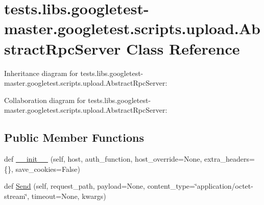 \hypertarget{classtests_1_1libs_1_1googletest-master_1_1googletest_1_1scripts_1_1upload_1_1AbstractRpcServer}{}\section{tests.\+libs.\+googletest-\/master.googletest.\+scripts.\+upload.\+Abstract\+Rpc\+Server Class Reference}
\label{classtests_1_1libs_1_1googletest-master_1_1googletest_1_1scripts_1_1upload_1_1AbstractRpcServer}


Inheritance diagram for tests.\+libs.\+googletest-\/master.googletest.\+scripts.\+upload.\+Abstract\+Rpc\+Server\+:


Collaboration diagram for tests.\+libs.\+googletest-\/master.googletest.\+scripts.\+upload.\+Abstract\+Rpc\+Server\+:
\subsection*{Public Member Functions}
\begin{DoxyCompactItemize}
\item 
def \hyperlink{classtests_1_1libs_1_1googletest-master_1_1googletest_1_1scripts_1_1upload_1_1AbstractRpcServer_a296f01a02e140393a05b984061e9b547}{\+\_\+\+\_\+init\+\_\+\+\_\+} (self, host, auth\+\_\+function, host\+\_\+override=None, extra\+\_\+headers=\{\}, save\+\_\+cookies=False)
\item 
def \hyperlink{classtests_1_1libs_1_1googletest-master_1_1googletest_1_1scripts_1_1upload_1_1AbstractRpcServer_acaa86b0b73f5dba9fb55b384f69b1a6b}{Send} (self, request\+\_\+path, payload=None, content\+\_\+type=\char`\"{}application/octet-\/stream\char`\"{}, timeout=None, kwargs)
\end{DoxyCompactItemize}
